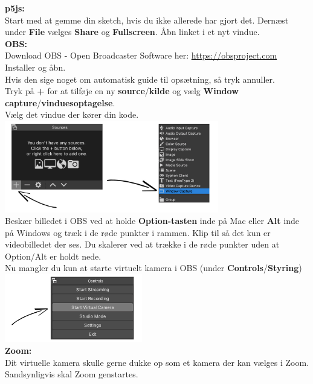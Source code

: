 \documentclass{ucph-handout}
\newcounter{handout}
\newcommand{\Ark}{Ark \#\arabic{handout} -- }
\begin{document}
\newpage


\renewcommand{\Title}{\Ark Virtuelt kamera}%

\begin{exercisebox}[adjusted title= Start virtuelt kamera]
\textbf{p5js:}\\
Start med at gemme din sketch, hvis du ikke allerede har gjort det. Dernæst under \textbf{File} vælges \textbf{Share} og \textbf{Fullscreen}. Åbn linket i et nyt vindue.  \\

\textbf{OBS:}\\
Download OBS - Open Broadcaster Software her: \url{https://obsproject.com}\\ 
Installer og åbn.\\

Hvis den sige noget om automatisk guide til opsætning, så tryk annuller.\\ 

Tryk på \textbf{+} for at tilføje en ny \textbf{source}/\textbf{kilde} og vælg \textbf{Window capture}/\textbf{vinduesoptagelse}. \\

Vælg det vindue der kører din kode.\\

\includegraphics[width=0.7\textwidth]{nyebilleder/sourses.jpg}\\

Beskær billedet i OBS ved at holde \textbf{Option-tasten} inde på Mac eller \textbf{Alt} inde på Windows og træk i de røde punkter i rammen. Klip til så det kun er videobilledet der ses. Du skalerer ved at trække i de røde punkter uden at Option/Alt er holdt nede. \\

Nu mangler du kun at starte virtuelt kamera i OBS (under \textbf{Controls}/\textbf{Styring}) \\

\includegraphics[width=0.45\textwidth]{nyebilleder/virtu.jpg}\\
\textbf{Zoom:}\\
Dit virtuelle kamera skulle gerne dukke op som et kamera der kan vælges i Zoom. Sandsynligvis skal Zoom genstartes.\\


\end{exercisebox}
\end{document}
